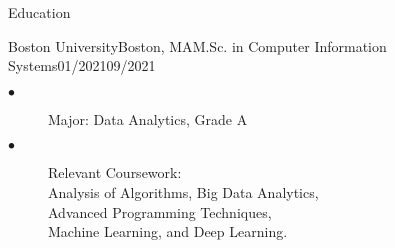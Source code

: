 \documentclass{resume}
\begin{document}
	\begin{multicols}{2}

	\begin{rSection}{\Large Education}
		\begin{school}{Boston University}{Boston, MA}{M.Sc. in Computer Information Systems}{01/2021}{09/2021}{
			\begin{description}
				\item[$\bullet$]Major:  Data Analytics, Grade A
				\item[$\bullet$]{Relevant Coursework: \\
				Analysis of Algorithms, Big Data Analytics, \\
				Advanced Programming Techniques,  \\
				Machine Learning, and Deep Learning.}
			\end{description}
		}
		\end{school}
		

\end{rSection}
\end{multicols}
\end{document}
